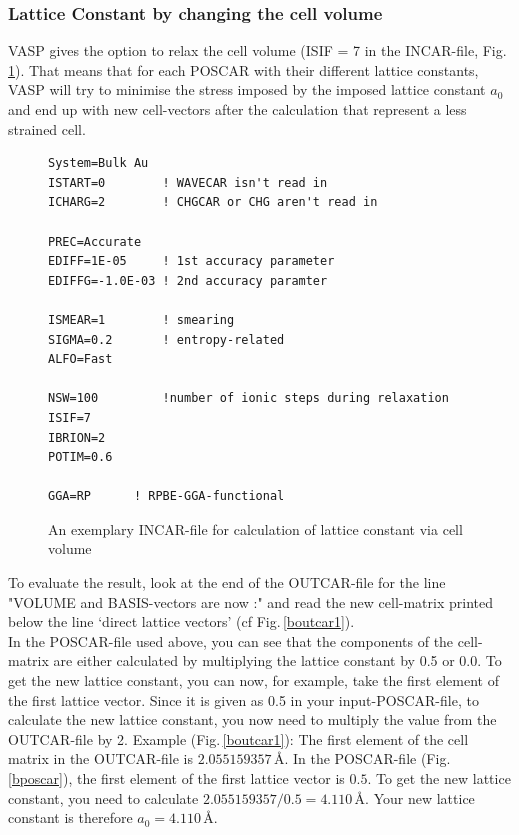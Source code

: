 \documentclass[11pt,oneside,a4paper, captions=nooneline, headsepline]{article}%
\begin{document}
\subsubsection*{Lattice Constant by changing the cell volume}
VASP gives the option to relax the cell volume (ISIF = 7 in the INCAR-file, Fig.\,\ref{bincar1}). That means that for each POSCAR with their different lattice constants, VASP will try to minimise the stress imposed by the imposed lattice constant $a_0$ and end up with new cell-vectors after the calculation that represent a less strained cell.
\begin{figure}[h!]
\begin{verbatim}
System=Bulk Au
ISTART=0		! WAVECAR isn't read in
ICHARG=2		! CHGCAR or CHG aren't read in

PREC=Accurate
EDIFF=1E-05		! 1st accuracy parameter
EDIFFG=-1.0E-03	! 2nd accuracy paramter

ISMEAR=1		! smearing
SIGMA=0.2		! entropy-related
ALFO=Fast

NSW=100			!number of ionic steps during relaxation
ISIF=7
IBRION=2
POTIM=0.6

GGA=RP		! RPBE-GGA-functional
\end{verbatim}
\caption{An exemplary INCAR-file for calculation of lattice constant via cell volume}
\label{bincar1}
\end{figure}
To evaluate the result, look at the end of the OUTCAR-file for the line "VOLUME and BASIS-vectors are now :" and read the new cell-matrix printed below the line `direct lattice vectors' (cf Fig.\,\ref{boutcar1}).\\
In the POSCAR-file used above, you can see that the components of the cell-matrix are either calculated by multiplying the lattice constant by 0.5 or 0.0. To get the new lattice constant, you can now, for example, take the first element of the first lattice vector. Since it is given as 0.5 in your input-POSCAR-file, to calculate the new lattice constant, you now need to multiply the value from the OUTCAR-file by 2. Example (Fig.\,\ref{boutcar1}): The first element of the cell matrix in the OUTCAR-file is $2.055159357$\,\AA. In the POSCAR-file (Fig.\,\ref{bposcar}), the first element of the first lattice vector is $0.5$. To get the new lattice constant, you need to calculate $2.055159357/0.5=4.110$\,\AA. Your new lattice constant is therefore $a_0=4.110$\,\AA.
\end{document}
